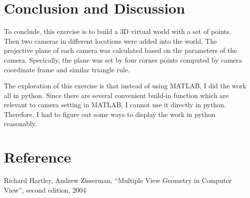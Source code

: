 \documentclass[11pt]{article}
\begin{document}
    \hypertarget{conclusion-and-discussion}{%
\section{Conclusion and Discussion}\label{conclusion-and-discussion}}

    To conclude, this exercise is to build a 3D virtual world with a set of
points. Then two cameras in different locations were added into the
world. The projective plane of each camera was calculated based on the
parameters of the camera. Specically, the plane was set by four corner
points computed by camera coordinate frame and similar triangle rule.

The exploration of this exercise is that instead of using MATLAB, I did
the work all in python. Since there are several convenient build-in
function which are relevant to camera setting in MATLAB, I cannot use it
directly in python. Therefore, I had to figure out some ways to display
the work in python reasonably.

    \hypertarget{reference}{%
\section{Reference}\label{reference}}

    Richard Hartley, Andrew Zisserman, ``Multiple View Geometry in Computer
View'', second edition, 2004


    
    
    
    
\end{document}
